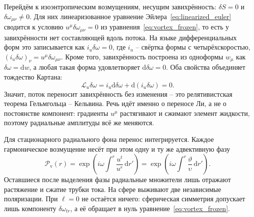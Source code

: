 \documentclass[12pt,a4paper,preprint,nopreprintline]{elsarticle}
\begin{document}
Перейдём к изоэнтропическим возмущениям, несущим завихрённость: $\delta S=0$ и $\delta\omega_{\mu\nu}\neq0$. Для них линеаризованное уравнение Эйлера~\eqref{eq:linearized_euler} сводится к условию $u^{\mu}\delta\omega_{\mu\nu}=0$ из уравнения~\eqref{eq:vortex_frozen}, то есть у завихрённости нет составляющей вдоль потока. На языке дифференциальных форм это записывается как $i_{u}\delta\omega=0$, где $i_{u}$ -- свёртка формы с четырёхскоростью, $(i_{u}\delta\omega)_{\nu}=u^{\mu}\delta\omega_{\mu\nu}$. Кроме того, завихрённость построена из одноформы $w_{\mu}$ как $\delta\omega=\mathrm{d}w$, а любая такая форма удовлетворяет $\mathrm{d}\delta\omega=0$. Оба свойства объединяет тождество Картана:
\begin{equation}
    \mathcal{L}_{u}\delta\omega
    =
    i_{u}\mathrm{d}\delta\omega
    +
    \mathrm{d}(i_{u}\delta\omega)
    =0.
    \label{eq:vorticity_lie_dragged}
\end{equation}
Значит, поток переносит завихрённость без изменения -- это релятивистская теорема Гельмгольца -- Кельвина. Речь идёт именно о переносе Ли, а не о постоянстве компонент: градиенты $u^{\mu}$ растягивают и сжимают элемент жидкости, поэтому радиальные амплитуды всё же меняются.

Для стационарного радиального фона перенос интегрируется. Каждое гармоническое возмущение несёт при этом одну и ту же адвективную фазу
\begin{equation}
    \mathcal{P}_{\mathrm{v}}(r)
    =
    \exp\left(
        i\omega\int^{r}\frac{u^{t}}{u^{r}}\,\mathrm{d}r'
    \right)
    =
    \exp\left(
        i\omega\int^{r}\frac{\vartheta}{\upsilon}\,\mathrm{d}r'
    \right).
    \label{eq:vortex_advection_phase}
\end{equation}
Оставшиеся после выделения фазы радиальные множители лишь отражают растяжение и сжатие трубки тока. На сфере выживают две независимые поляризации. При $\ell=0$ не остаётся ничего: сферическая симметрия допускает лишь компоненту $\delta\omega_{tr}$, а её обращает в нуль уравнение~\eqref{eq:vortex_frozen}.
\end{document}
